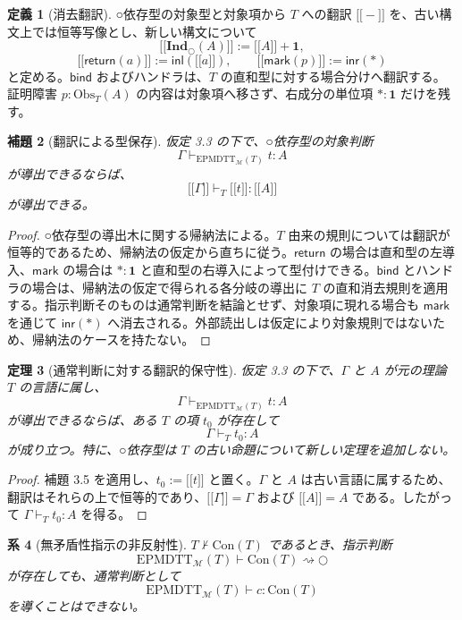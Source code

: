 \documentclass[a4paper,11pt]{ltjsarticle}
\theoremstyle{definition}
\newtheorem{definition}{定義}[section]
\theoremstyle{plain}
\newtheorem{theorem}[definition]{定理}
\newtheorem{lemma}[definition]{補題}
\newtheorem{corollary}[definition]{系}
\newcommand{\dfix}{\bigcirc}
\newcommand{\EPMDTT}{\mathrm{EPMDTT}}
\newcommand{\Obs}{\mathrm{Obs}}
\newcommand{\Con}{\mathrm{Con}}
\newcommand{\Ind}{\mathbf{Ind}_{\dfix}}
\newcommand{\Meta}{\mathcal{M}}
\newcommand{\Unit}{\mathbf{1}}
\newcommand{\sem}[1]{\mathopen{[\![}#1\mathclose{]\!]}}
\begin{document}
\begin{definition}[消去翻訳]
○依存型の対象型と対象項から $T$ への翻訳 $\sem{-}$ を、古い構文上では恒等写像とし、新しい構文について
\[
 \sem{\Ind(A)}
 :=\sem{A}+\Unit,
\]
\[
 \sem{\mathsf{return}(a)}
 :=\mathsf{inl}(\sem{a}),
 \qquad
 \sem{\mathsf{mark}(p)}
 :=\mathsf{inr}(\ast)
\]
と定める。$\mathsf{bind}$ およびハンドラは、$T$ の直和型に対する場合分けへ翻訳する。証明障害 $p:\Obs_T(A)$ の内容は対象項へ移さず、右成分の単位項 $\ast:\Unit$ だけを残す。
\end{definition}

\begin{lemma}[翻訳による型保存]
仮定 3.3 の下で、○依存型の対象判断
\[
 \Gamma\vdash_{\EPMDTT_{\Meta}(T)}t:A
\]
が導出できるならば、
\[
 \sem{\Gamma}
 \vdash_T
 \sem{t}:\sem{A}
\]
が導出できる。
\end{lemma}

\begin{proof}
○依存型の導出木に関する帰納法による。$T$ 由来の規則については翻訳が恒等的であるため、帰納法の仮定から直ちに従う。$\mathsf{return}$ の場合は直和型の左導入、$\mathsf{mark}$ の場合は $\ast:\Unit$ と直和型の右導入によって型付けできる。$\mathsf{bind}$ とハンドラの場合は、帰納法の仮定で得られる各分岐の導出に $T$ の直和消去規則を適用する。指示判断そのものは通常判断を結論とせず、対象項に現れる場合も $\mathsf{mark}$ を通じて $\mathsf{inr}(\ast)$ へ消去される。外部読出しは仮定により対象規則ではないため、帰納法のケースを持たない。
\end{proof}

\begin{theorem}[通常判断に対する翻訳的保守性]
仮定 3.3 の下で、$\Gamma$ と $A$ が元の理論 $T$ の言語に属し、
\[
 \Gamma\vdash_{\EPMDTT_{\Meta}(T)}t:A
\]
が導出できるならば、ある $T$ の項 $t_0$ が存在して
\[
 \Gamma\vdash_T t_0:A
\]
が成り立つ。特に、○依存型は $T$ の古い命題について新しい定理を追加しない。
\end{theorem}

\begin{proof}
補題 3.5 を適用し、$t_0:=\sem{t}$ と置く。$\Gamma$ と $A$ は古い言語に属するため、翻訳はそれらの上で恒等的であり、$\sem{\Gamma}=\Gamma$ および $\sem{A}=A$ である。したがって $\Gamma\vdash_Tt_0:A$ を得る。
\end{proof}

\begin{corollary}[無矛盾性指示の非反射性]
$T\nvdash\Con(T)$ であるとき、指示判断
\[
 \EPMDTT_{\Meta}(T)\vdash\Con(T)\rightsquigarrow\dfix
\]
が存在しても、通常判断として
\[
 \EPMDTT_{\Meta}(T)\vdash c:\Con(T)
\]
を導くことはできない。
\end{corollary}
\end{document}
